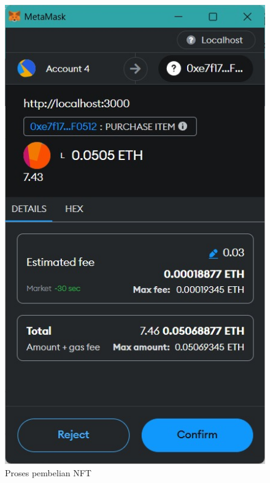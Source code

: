 \begin{itemize}
      \begin{figure} [H] \centering
        \includegraphics[scale=0.45]{gambar/make_item.jpeg}
        \caption{Proses pembelian NFT}
        \label{fig:makeitem}
        \end{figure}
      


\end{itemize}
